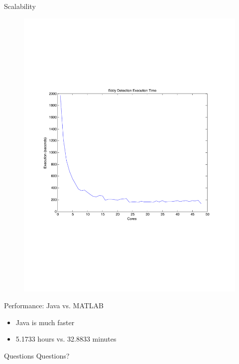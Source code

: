 \documentclass[mathserif]{beamer}
\begin{document}
\begin{frame}{Scalability}
\begin{figure}
\centering
\includegraphics[scale=.5]{figures/times.pdf}
\end{figure}
\end{frame}

\begin{frame}[fragile]{Performance: Java vs. MATLAB}
\begin{itemize}
\item Java is much faster
\item 5.1733 hours vs. 32.8833 minutes
\end{itemize}

\end{frame}


\begin{frame}{Questions}
\centering
\large{Questions?}

\end{frame}
\end{document}
